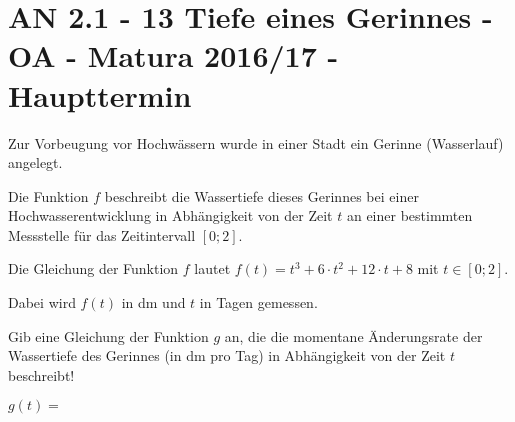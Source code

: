\section{AN 2.1 - 13 Tiefe eines Gerinnes - OA - Matura 2016/17 - Haupttermin}

\begin{beispiel}[AN 2.1]{1} %
Zur Vorbeugung vor Hochwässern wurde in einer Stadt ein Gerinne (Wasserlauf) angelegt. \leer

Die Funktion $f$ beschreibt die Wassertiefe dieses Gerinnes bei einer Hochwasserentwicklung in
Abhängigkeit von der Zeit $t$ an einer bestimmten Messstelle für das Zeitintervall $[0; 2]$. \leer

Die Gleichung der Funktion $f$ lautet $f(t)=t^3+6\cdot t^2+12\cdot t +8$ mit $t\in [0; 2]$. \leer

Dabei wird $f(t)$ in dm und $t$ in Tagen gemessen. \leer

Gib eine Gleichung der Funktion $g$ an, die die momentane Änderungsrate der Wassertiefe
des Gerinnes (in dm pro Tag) in Abhängigkeit von der Zeit $t$ beschreibt! \leer

$g(t)=$  


\end{beispiel}